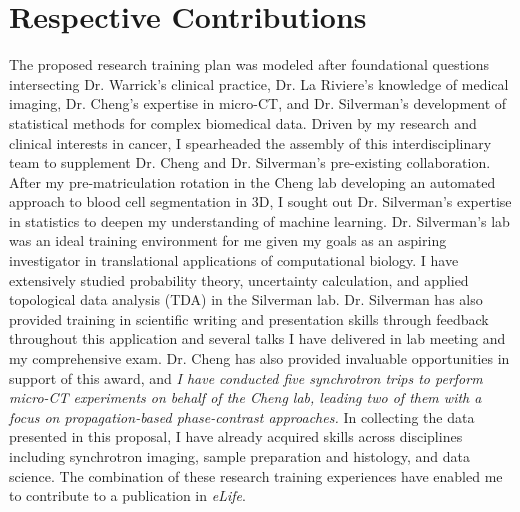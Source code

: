 \documentclass{NIHGrant}
\begin{document}
\part*{Respective Contributions}
The proposed research training plan was modeled after foundational questions intersecting Dr. Warrick's clinical practice, Dr. La Riviere's knowledge of medical imaging, Dr. Cheng's expertise in micro-CT, and Dr. Silverman's development of statistical methods for complex biomedical data. Driven by my research and clinical interests in cancer, I spearheaded the assembly of this interdisciplinary team to supplement Dr. Cheng and Dr. Silverman's pre-existing collaboration. After my pre-matriculation rotation in the Cheng lab developing an automated approach to blood cell segmentation in 3D, I sought out Dr. Silverman's expertise in statistics to deepen my understanding of machine learning. Dr. Silverman's lab was an ideal training environment for me given my goals as an aspiring investigator in translational applications of computational biology. I have extensively studied probability theory, uncertainty calculation, and applied topological data analysis (TDA) in the Silverman lab. Dr. Silverman has also provided training in scientific writing and presentation skills through feedback throughout this application and several talks I have delivered in lab meeting and my comprehensive exam. Dr. Cheng has also provided invaluable opportunities in support of this award, and \emph{I have conducted five synchrotron trips to perform micro-CT experiments on behalf of the Cheng lab, leading two of them with a focus on propagation-based phase-contrast approaches.} In collecting the data presented in this proposal, I have already acquired skills across disciplines including synchrotron imaging, sample preparation and histology, and data science. The combination of these research training experiences have enabled me to contribute to a publication in \textit{eLife}.
\end{document}
